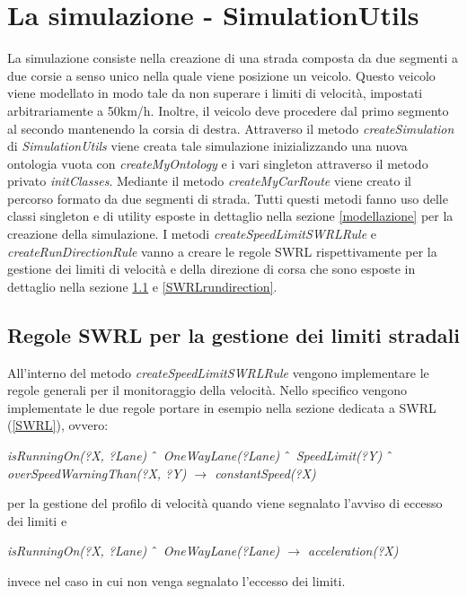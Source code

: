 \section{La simulazione - SimulationUtils}
La simulazione consiste nella creazione di una strada composta da due segmenti a due corsie a senso unico nella quale viene posizione un veicolo.
Questo veicolo viene modellato in modo tale da non superare i limiti di velocit\`a, impostati arbitrariamente a 50km/h.
Inoltre, il veicolo deve procedere dal primo segmento al secondo mantenendo la corsia di destra.
Attraverso il metodo \textit{createSimulation} di \textit{SimulationUtils} viene creata tale simulazione inizializzando una nuova ontologia vuota con \textit{createMyOntology} e i vari singleton attraverso il metodo privato \textit{initClasses}.
Mediante il metodo \textit{createMyCarRoute} viene creato il percorso formato da due segmenti di strada.
Tutti questi metodi fanno uso delle classi singleton e di utility esposte in dettaglio nella sezione \ref{modellazione} per la creazione della simulazione.
I metodi \textit{createSpeedLimitSWRLRule} e \textit{createRunDirectionRule} vanno a creare le regole SWRL rispettivamente per la gestione dei limiti di velocit\`a e della direzione di corsa che sono esposte in dettaglio nella sezione \ref{SWRLspeedlimit} e \ref{SWRLrundirection}.
\subsection{Regole SWRL per la gestione dei limiti stradali}\label{SWRLspeedlimit}
All'interno del metodo \textit{createSpeedLimitSWRLRule} vengono implementare le regole generali per il monitoraggio della velocit\`a. Nello specifico vengono implementate le due regole portare in esempio nella sezione dedicata a SWRL (\ref{SWRL}), ovvero:
\begin{center}
\emph{isRunningOn(?X, ?Lane) $\char`\^$ OneWayLane(?Lane) $\char`\^$ SpeedLimit(?Y) $\char`\^$ overSpeedWarningThan(?X, ?Y) $\rightarrow$ constantSpeed(?X)}\\
\end{center}
per la gestione del profilo di velocit\`a quando viene segnalato l'avviso di eccesso dei limiti e
\begin{center}
\emph{isRunningOn(?X, ?Lane) $\char`\^$ OneWayLane(?Lane) $\rightarrow$ acceleration(?X)}\\
\end{center}
invece nel caso in cui non venga segnalato l'eccesso dei limiti.

